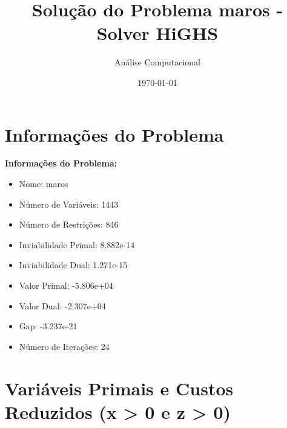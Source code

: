 \documentclass[12pt]{article}
\title{Solução do Problema maros - Solver HiGHS}
\author{Análise Computacional}
\date{\today}
\begin{document}
\maketitle

\section{Informações do Problema}

\textbf{Informações do Problema:}
\begin{itemize}
\item Nome: maros
\item Número de Variáveis: 1443
\item Número de Restrições: 846
\item Inviabilidade Primal: 8.882e-14
\item Inviabilidade Dual: 1.271e-15
\item Valor Primal: -5.806e+04
\item Valor Dual: -2.307e+04
\item Gap: -3.237e-21
\item Número de Iterações: 24
\end{itemize}


\section{Variáveis Primais e Custos Reduzidos (x > 0 e z > 0)}
\end{document}
